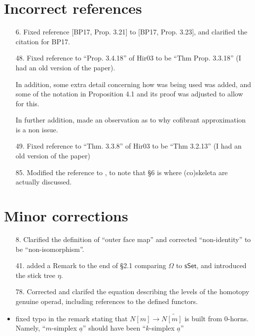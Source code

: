 \documentclass{article}
\begin{document}
\section{Incorrect references}

\begin{itemize}
\item[6.] Fixed reference [BP17, Prop. 3.21] to [BP17, Prop. 3.23], and clarified the citation for BP17.
\item[48.] Fixed reference to ``Prop. 3.4.18'' of Hir03 to be ``Thm Prop. 3.3.18'' (I had an old version of the paper).

In addition, some extra detail concerning how \cite[Prop. 3.3.18]{Hir03} was being used was added, and some of the notation in Proposition 4.1 and its proof was adjusted to allow for this.

In further addition, made an observation as to why cofibrant approximation is a non issue.

\item[49.] Fixed reference to ``Thm. 3.3.8'' of Hir03 to be ``Thm 3.2.13'' (I had an old version of the paper)

\item[85.] Modified the reference \cite[\S 4]{BM11} to \cite[\S 4,\S 6]{BM11}, to note that \S 6 is where (co)skeleta are actually discussed. 
\end{itemize}



\section{Minor corrections}

\begin{itemize}
\item[8.] Clarified the definition of ``outer face map'' and corrected ``non-identity'' to be ``non-isomorphism''.
\item[41.] added a Remark to the end of \S 2.1 comparing $\Omega$ to $\mathsf{sSet}$, and introduced the stick tree $\eta$.
\item[78.] Corrected and clarifed the equation describing the levels of the homotopy genuine operad, including references to the defined functors.
\item fixed typo in the remark stating that $N[m] \to N \widetilde{[m]}$ is built from $0$-horns. Namely, ``$m$-simplex $\underline{a}$'' should have been ``$k$-simplex $\underline{a}$''
\end{itemize}
\end{document}
